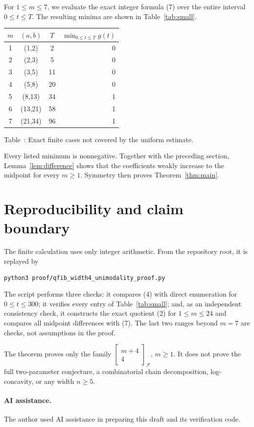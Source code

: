 \documentclass[11pt]{article}
\newcommand{\qfib}[2]{\left[\!\begin{matrix}#1\\#2\end{matrix}\!\right]_{\!\mathcal F}}
\begin{document}
For \(1\leq m\leq7\), we evaluate the exact integer formula (7) over the
entire interval \(0\leq t\leq T\).  The resulting minima are shown in
Table~\ref{tab:small}.

\begin{center}
\label{tab:small}
\centering
\begin{tabular}{cccr}
\toprule
\(m\)&\((a,b)\)&\(T\)&\(\min_{0\leq t\leq T}g(t)\)\\
\midrule
1&(1,2)&2&0\\
2&(2,3)&5&0\\
3&(3,5)&11&0\\
4&(5,8)&20&0\\
5&(8,13)&34&1\\
6&(13,21)&58&1\\
7&(21,34)&96&1\\
\bottomrule
\end{tabular}

\smallskip
\small Table~\thetable: Exact finite cases not covered by the uniform estimate.
\end{center}

Every listed minimum is nonnegative.  Together with the preceding section,
Lemma~\ref{lem:difference} shows that the coefficients weakly increase to the
midpoint for every \(m\geq1\).  Symmetry then proves
Theorem~\ref{thm:main}.

\section{Reproducibility and claim boundary}

The finite calculation uses only integer arithmetic.  From the repository
root, it is replayed by
\begin{verbatim}
python3 proof/qfib_width4_unimodality_proof.py
\end{verbatim}
The script performs three checks: it compares (4) with direct enumeration for
\(0\leq t\leq300\); it verifies every entry of Table~\ref{tab:small}; and,
as an independent consistency check, it constructs the exact quotient (2)
for \(1\leq m\leq24\) and compares all midpoint differences with (7).  The
last two ranges beyond \(m=7\) are checks, not assumptions in the proof.

The theorem proves only the family \(\qfib{m+4}{4}\), \(m\geq1\).  It does
not prove the full two-parameter conjecture, a combinatorial chain
decomposition, log-concavity, or any width \(n\geq5\).

\paragraph{AI assistance.}
The author used AI assistance in preparing this draft and its verification
code.



\end{document}
